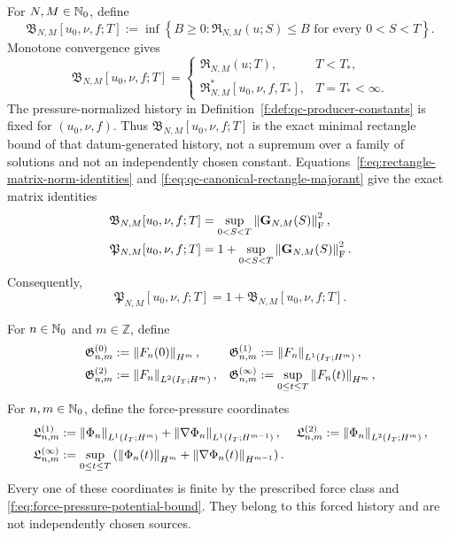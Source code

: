 \begin{definition}
\label{f:def:qc-canonical-majorants}
For \(N,M\in\mathbb N_0\), define
\begin{equation}
 \mathfrak B_{N,M}[u_0,\nu,f;T]
 :=\inf\left\{B\ge0:
 \mathfrak R_{N,M}(u;S)\le B
 \text{ for every }0<S<T\right\}.
 \label{f:eq:qc-canonical-rectangle-majorant}
\end{equation}
Monotone convergence gives
\begin{equation}
 \mathfrak B_{N,M}[u_0,\nu,f;T]
 =\begin{cases}
   \mathfrak R_{N,M}(u;T),&T<T_*,\\
   \mathfrak R_{N,M}^*[u_0,\nu,f,T_*],&T=T_*<\infty.
  \end{cases}
 \label{f:eq:qc-canonical-rectangle-identification}
\end{equation}
The pressure-normalized history in
Definition~\ref{f:def:qc-producer-constants} is fixed for \((u_0,\nu,f)\).
Thus
\(\mathfrak B_{N,M}[u_0,\nu,f;T]\) is the exact minimal rectangle bound of
that datum-generated history, not a supremum over a family of solutions and
not an independently chosen constant.
Equations~\eqref{f:eq:rectangle-matrix-norm-identities} and
\eqref{f:eq:qc-canonical-rectangle-majorant} give the exact matrix identities
\begin{align}
 \mathfrak B_{N,M}[u_0,\nu,f;T]
 &=\sup_{0<S<T}\left\lVert \mathbf G_{N,M}(S)\right\rVert_{\mathrm F}^2,
 \label{f:eq:qc-B-matrix-identity}\\
 \mathfrak P_{N,M}[u_0,\nu,f;T]
 &=1+\sup_{0<S<T}\left\lVert \mathbf G_{N,M}(S)\right\rVert_{\mathrm F}^2.
 \label{f:eq:qc-P-matrix-identity}
\end{align}
Consequently,
\begin{equation}
 \mathfrak P_{N,M}[u_0,\nu,f;T]
 =1+\mathfrak B_{N,M}[u_0,\nu,f;T].
 \label{f:eq:qc-producer-through-B}
\end{equation}

For \(n\in\mathbb N_0\) and \(m\in\mathbb Z\), define
\begin{align}
 \mathfrak G^{(0)}_{n,m}
 &:=\left\lVert F_n(0)\right\rVert_{H^m},
 &
 \mathfrak G^{(1)}_{n,m}
 &:=\left\lVert F_n\right\rVert_{L^1(I_T;H^m)},
 \notag\\
 \mathfrak G^{(2)}_{n,m}
 &:=\left\lVert F_n\right\rVert_{L^2(I_T;H^m)},
 &
 \mathfrak G^{(\infty)}_{n,m}
 &:=\sup_{0\le t\le T}\left\lVert F_n(t)\right\rVert_{H^m},
 \label{f:eq:qc-force-row-majorants}
\end{align}
For \(n,m\in\mathbb N_0\), define the force-pressure coordinates
\begin{align}
 \mathfrak L^{(1)}_{n,m}
 &:=\left\lVert \Phi_n\right\rVert_{L^1(I_T;H^m)}
   +\left\lVert \nabla\Phi_n\right\rVert_{L^1(I_T;H^{m-1})},
 &
 \mathfrak L^{(2)}_{n,m}
 &:=\left\lVert \Phi_n\right\rVert_{L^2(I_T;H^m)},
 \notag\\
 \mathfrak L^{(\infty)}_{n,m}
 &:=\sup_{0\le t\le T}\left(
 \left\lVert \Phi_n(t)\right\rVert_{H^m}
 +\left\lVert \nabla\Phi_n(t)\right\rVert_{H^{m-1}}\right).
 \label{f:eq:qc-force-pressure-majorants}
\end{align}
Every one of these coordinates is finite by the prescribed force class and
\eqref{f:eq:force-pressure-potential-bound}.  They belong to this forced
history and are not independently chosen sources.


\end{definition}
